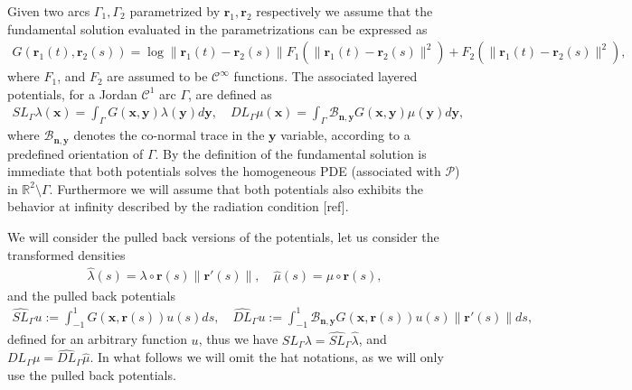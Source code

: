 \documentclass{article}
\newcommand{\todo}[1]{{\color{red}[#1]}}
\newcommand{\IR}{{\mathbb R}}
\newcommand{\cP}{\mathcal{P}}
\newcommand{\bn}{\bm{n}}
\newcommand{\br}{\bm{r}}
\newcommand{\bx}{\bm{x}}
\newcommand{\by}{\bm{y}}
\begin{document}
Given two arcs $\Gamma_1, \Gamma_2$ parametrized by $\br_1, \br_2$ respectively we assume that the fundamental solution evaluated in the parametrizations can be expressed as
\begin{align}
\label{eq:funsolgen}
G(\br_1(t), \br_2(s) )  =
\log \|\br_1(t) -\br_2(s) \| F_1(\|\br_1(t) -\br_2(s) \| ^2)+F_2(\|\br_1(t) -\br_2(s) \| ^2),
\end{align}
where $F_1$, and $F_2$ are assumed to be $\mathcal{C}^\infty$ functions. The associated layered potentials, for a Jordan $\mathcal{C}^1$ arc $\Gamma$, are defined as 
\begin{align*}
SL_\Gamma \lambda(\bx) = \int_\Gamma G(\bx,\by) \lambda(\by) d\by, \quad DL_\Gamma \mu(\bx) = \int_\Gamma \mathcal{B}_{\bn,\by} G(\bx,\by) \mu(\by) d\by,
\end{align*} 
where $\mathcal{B}_{\bn,\by}$ denotes the co-normal trace in the $\by$ variable, according to a predefined orientation of $\Gamma$. By the definition of the fundamental solution is immediate that both potentials solves the homogeneous PDE (associated with $\cP$) in $\IR^2 \setminus \Gamma$. Furthermore we will assume that both potentials also exhibits the behavior at infinity described by the radiation condition \todo{ref}. 

We will consider the pulled back versions of the potentials, let us consider the transformed densities 
\begin{align*}
\widehat{\lambda} (s) = \lambda \circ \br(s)  \| \br'(s) \|, \quad 
\widehat{\mu} (s) = \mu \circ \br(s),
\end{align*}
and the pulled back potentials 
\begin{align*}
\widehat{SL}_{\Gamma} u := \int_{-1}^1 
 G(\bx,\br(s))  u(s) ds, \quad 
 \widehat{DL}_{\Gamma} u := \int_{-1}^1 
 \mathcal{B}_{\bn,\by}G(\bx,\br(s))  u(s) \|\br'(s)\|ds,
\end{align*}
defined for an arbitrary function $u$, thus we have $SL_\Gamma \lambda  = \widehat{SL}_\Gamma \widehat{\lambda}$, and $DL_\Gamma \mu  = \widehat{DL}_\Gamma \widehat{\mu}$. In what follows we will omit the hat notations, as we will only use the pulled back potentials. 
\end{document}

